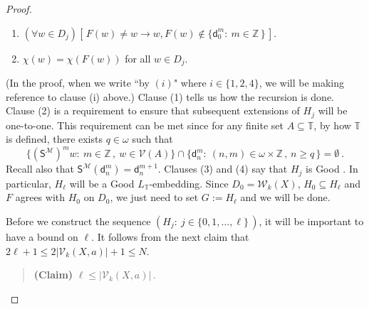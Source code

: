 \documentclass[10pt,a4paper, openany,  oldfontcommands]{memoir}
\newtheorem{open problem} [theorem] {Open Problem}
\newtheorem{open question} [theorem] {Open Question}
\renewcommand{\mathrm}{\mathsf}
\begin{document}
\begin{proof}
\begin{enumerate}
  
\item  $  \left(   \forall   w  \in  D_j   \right)   \left[  \,   F(w)  \neq  w   \rightarrow   w,  F(w)  \not\in   \lbrace  \mathsf{d}^m_0  :   \   m  \in  \mathbb{Z}  \,    \rbrace    \,    \right]   $.



\item  $  \chi \left(  w  \right)   =     \chi \left( F( w ) \right)   $  for all   $  w  \in  D_j    $.
\end{enumerate}
(In the proof, when we write ``by $(i) $" where $  i \in \lbrace 1, 2,  4  \rbrace $, we will be making reference to clause (i) above.)
Clause (1) tells us how the recursion is done. 
Clause (2) is a requirement to ensure that subsequent extensions of  $  H_j $ will be one-to-one.
This requirement can be met since for  any finite  set  $  A  \subseteq  \mathbb{T}  $,  by how  $  \mathbb{T}  $  is defined, 
  there exists   $  q  \in  \omega  $  such that  
\[
 \big\{   \left(  \mathrm{S}^{  \mathcal{M}  }  \right)^m  w  :   \   
  m  \in   \mathbb{Z}  \,  ,    \     w  \in     \mathcal{V}     \left(  A \right)      \big\}
 \cap  
 \big\{  \mathsf{d}^m_n  :   \   (n, m )  \in  \omega  \times   \mathbb{Z}   \,  ,    \,   n \geq   q  \, \big\}
  = 
   \emptyset  
  \     .
  \]
Recall also that  $  \mathrm{S}^{  \mathcal{M}  }  \left(   \mathsf{d}^m_n  \right)  =  \mathsf{d}^{m+1}_n   $. 
Clauses (3) and (4) say that  $  H_j $  is   \textsf{Good} . 
In particular,   $  H_{  \ell  }  $  will be a    \textsf{Good}  $ L_{  \mathbb{T} }  $-embedding. 
Since  $  D_0 =   \mathcal{W}_{ k }  \left(  X  \right)    $,  $  H_0  \subseteq  H_{  \ell }  $  and  $F$ agrees with  $  H_0  $  on  $  D_0  $,  
we just need to set  $G :=   H_{  \ell  }   $  and we will be  done.








Before we construct the sequence    $  \left(  H_j  :   \  j  \in  \lbrace 0, 1,  \ldots  ,  \ell  \rbrace   \,  \right)  $, 
it will be important to have a bound on $  \ell  $. 
It follows from the next claim that  $  2  \ell + 1  \leq  2  \vert   \mathcal{V}_k   \left(     X,  a  \right)    \vert     +1  \leq     N  $. 

   \begin{quote} {\bf (Claim)} \;\;\;\;\;\;    
$   \ell   \leq   \vert   \mathcal{V}_k   \left(     X,  a  \right)    \vert     \,  $.
 \end{quote}  


\end{proof}
\end{document}
